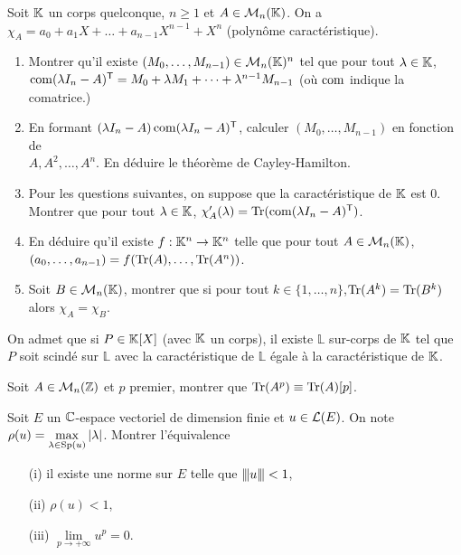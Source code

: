\documentclass[12pt]{article}
\begin{document}
\begin{exercise}
	Soit $\mathbb{K}$ un corps quelconque, $n\geqslant1$ et $A\in\mathcal{M}_{n}(\mathbb{K})$. On a $\chi_{A}=a_{0}+a_{1}X+\dots+a_{n-1}X^{n-1}+X^{n}$ (polynôme caractéristique).
	\begin{enumerate}
		\item Montrer qu'il existe $(M_{0},\dots,M_{n-1})\in\mathcal{M}_{n}(\mathbb{K})^{n}$ tel que pour tout $\lambda\in\mathbb{K}$, $\operatorname{com}(\lambda I_{n}-A)^{\mathsf{T}}=M_{0}+\lambda M_{1}+\dots+\lambda^{n-1}M_{n-1}$ (où $\operatorname{com}$ indique la comatrice.)
		\item En formant $(\lambda I_{n}-A)\operatorname{com}(\lambda I_{n}-A)^{\mathsf{T}}$, calculer $(M_{0},\dots,M_{n-1})$ en fonction de \\$A,A^{2},\dots,A^{n}$. En déduire le théorème de Cayley-Hamilton.
		\item Pour les questions suivantes, on suppose que la caractéristique de $\mathbb{K}$ est 0. Montrer que pour tout $\lambda\in\mathbb{K}$, $\chi_{A}'(\lambda)=\operatorname{Tr}(\operatorname{com}(\lambda I_{n}-A)^{\mathsf{T}})$.
		\item En déduire qu'il existe $f:\mathbb{K}^{n}\to\mathbb{K}^{n}$ telle que pour tout $A\in\mathcal{M}_{n}(\mathbb{K})$, $(a_{0},\dots,a_{n-1}) = f(\operatorname{Tr}(A),\dots,\operatorname{Tr}(A^{n}))$.
		\item Soit $B\in\mathcal{M}_{n}(\mathbb{K})$, montrer que si pour tout $k\in\{1,\dots,n\}$,$\operatorname{Tr}(A^{k})=\operatorname{Tr}(B^{k})$ alors $\chi_{A}=\chi_{B}$.
	\end{enumerate}
\end{exercise}

\begin{exercise}
	On admet que si $P\in\mathbb{K}[X]$ (avec $\mathbb{K}$ un corps), il existe $\mathbb{L}$ sur-corps de $\mathbb{K}$ tel que $P$ soit scindé sur $\mathbb{L}$ avec la caractéristique de $\mathbb{L}$ égale à la caractéristique de $\mathbb{K}$.

	Soit $A\in\mathcal{M}_{n}(\mathbb{Z})$ et $p$ premier, montrer que $\operatorname{Tr}(A^{p})\equiv\operatorname{Tr}(A)[p]$.
\end{exercise}

\begin{exercise}
	Soit $E$ un $\mathbb{C}$-espace vectoriel de dimension finie et $u\in\mathcal{L}(E)$. On note $\rho(u)=\max\limits_{\lambda\in\operatorname{Sp}(u)}\vert \lambda\vert$. Montrer l'équivalence
	\begin{enumerate}
		\item [(i)] il existe une norme sur $E$ telle que ${\left\vert\kern-0.25ex\left\vert\kern-0.25ex\left\vert{}u \right\vert\kern-0.25ex\right\vert\kern-0.25ex\right\vert}<1$,
		\item [(ii)] $\rho(u)<1$,
		\item [(iii)] $\lim\limits_{p\to+\infty}u^{p}=0$.
	\end{enumerate}
\end{exercise}
\end{document}
